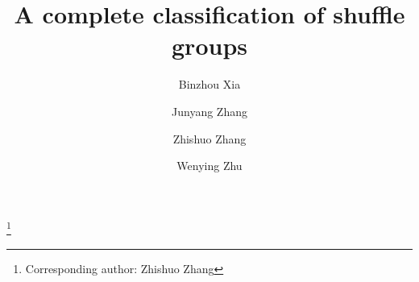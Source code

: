 \documentclass[11pt,a4paper,reqno]{amsart}
\theoremstyle{definition}
\begin{document}
\title[A complete classification of shuffle groups]{A complete classification of shuffle groups}

\author[Xia]{Binzhou Xia}
\address{School of Mathematics and Statistics\\The University of Melbourne\\Parkville, VIC 3010\\Australia}

\author[Zhang]{Junyang Zhang}
\address{School of Mathematical Sciences\\Chongqing Normal University\\Chongqing, 401331\\P.R.~China}

\author[Zhang]{Zhishuo Zhang}
\thanks{Corresponding author: Zhishuo Zhang}
\address{School of Mathematics and Statistics\\The University of Melbourne\\Parkville, VIC 3010\\Australia}

\author[Zhu]{Wenying Zhu}
\address{School of Mathematical Sciences, and Hebei Center for Applied Mathematics\\Hebei Normal University\\
Shijiazhuang, 050024\\P.R.~China}




\end{document}
